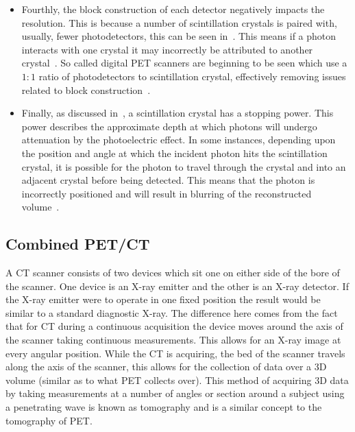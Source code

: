 \begin{itemize}
                    \item Fourthly, the block construction of each detector negatively impacts the resolution. This is because a number of scintillation crystals is paired with, usually, fewer photodetectors, this can be seen in~. This means if a photon interacts with one crystal it may incorrectly be attributed to another crystal~\parencite{Nieman2015}. So called digital \gls{PET} scanners are beginning to be seen which use a $1:1$ ratio of photodetectors to scintillation crystal, effectively removing issues related to block construction~\parencite{Schillaci2019DigitalImaging}.
                    
                    \item Finally, as discussed in~, a scintillation crystal has a stopping power. This power describes the approximate depth at which photons will undergo attenuation by the photoelectric effect. In some instances, depending upon the position and angle at which the incident photon hits the scintillation crystal, it is possible for the photon to travel through the crystal and into an adjacent crystal before being detected. This means that the photon is incorrectly positioned and will result in blurring of the reconstructed volume~\parencite{Nieman2015}.
                \end{itemize}
        
        \subsection{Combined PET/CT} \label{sec:combined_pet_ct}
            A \gls{CT} scanner consists of two devices which sit one on either side of the bore of the scanner. %
            One device is an X-ray emitter and the other is an X-ray detector. If the X-ray emitter were to operate in one fixed position the result would be similar to a standard diagnostic X-ray. The difference here comes from the fact that for \gls{CT} during a continuous acquisition the device moves around the axis of the scanner taking continuous measurements. This allows for an X-ray image at every angular position. While the \gls{CT} is acquiring, the bed of the scanner travels along the axis of the scanner, %
            this allows for the collection of data over a \gls{3D} volume (similar as to what \gls{PET} collects over). This method of acquiring \gls{3D} data by taking measurements at a number of angles or section around a subject using a penetrating wave is known as tomography and is a similar concept to the tomography of \gls{PET}.
            
